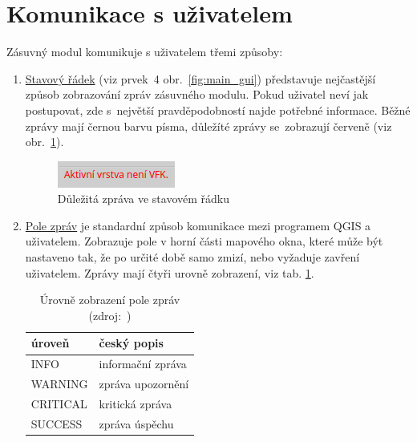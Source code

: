 \section{Komunikace s uživatelem}
\label{komunikace}

Zásuvný modul komunikuje s uživatelem třemi způsoby:

\begin{enumerate}[leftmargin=1.5cm, noitemsep]
	\item \underline{Stavový řádek} (viz prvek~4 obr.~\ref{fig:main_gui}) představuje nejčastější způsob zobrazování zpráv zásuvného modulu. Pokud  uživatel neví jak postupovat, zde s~největší pravděpodobností najde potřebné informace. Běžné zprávy mají černou barvu písma, důležíté zprávy se~zobrazují červeně (viz obr.~\ref{fig:dulezita_zprava}).
	
	\begin{figure}[H]
		\centering
		\includegraphics[width=.23\textwidth]{./pictures/statusbar-red_message.png}
		\caption[Důležitá zpráva ve stavovém řádku]{Důležitá zpráva ve stavovém řádku}
		\label{fig:dulezita_zprava}
 	\end{figure}	

	\item \underline{Pole zpráv} je standardní způsob komunikace mezi programem QGIS a uživatelem. Zobrazuje pole v horní části mapového okna, které může být nastaveno tak, že po určité době samo zmizí, nebo vyžaduje zavření uživatelem. Zprávy mají čtyři urovně zobrazení, viz tab. \ref{tab:urovne_pole_zprav}.

\begin{table}[H]
    \begin{tabular}{|l|l|}
        \hline
         úroveň & český popis \\
        \hline
        \hline
         INFO & informační zpráva \\ \hline
         WARNING & zpráva upozornění \\ \hline
         CRITICAL & kritická zpráva \\ \hline
         SUCCESS & zpráva úspěchu \\
         \hline
    \end{tabular}
    \centering
    \caption[Úrovně zobrazení pole zpráv]{Úrovně zobrazení pole zpráv (zdroj:~\citep{qgis_api})}
    \label{tab:urovne_pole_zprav}
\end{table}


\end{enumerate}
